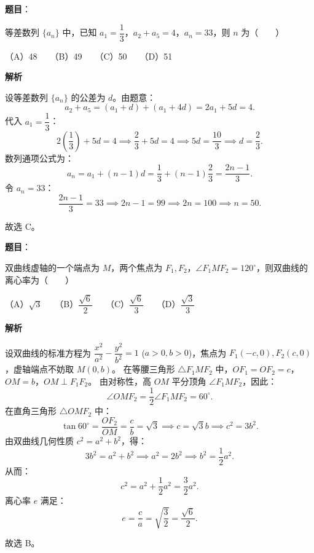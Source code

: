 \begin{answer}

\textbf{题目}：

等差数列 $\{a_n\}$ 中，已知 $a_1 = \dfrac{1}{3}$，$a_2 + a_5 = 4$，$a_n = 33$，则 $n$ 为\mbox{（　　）}

（A）48　　（B）49　　（C）50　　（D）51

\textbf{解析}

设等差数列 $\{a_n\}$ 的公差为 $d$。由题意：
\nopagebreak[4]
\[a_2 + a_5 = (a_1 + d) + (a_1 + 4d) = 2a_1 + 5d = 4.\]
代入 $a_1 = \dfrac{1}{3}$：
\nopagebreak[4]
\[2 \left(\frac{1}{3}\right) + 5d = 4 \implies \frac{2}{3} + 5d = 4 \implies 5d = \frac{10}{3} \implies d = \frac{2}{3}.\]
数列通项公式为：
\nopagebreak[4]
\[a_n = a_1 + (n - 1)d = \frac{1}{3} + (n - 1)\frac{2}{3} = \frac{2n - 1}{3}.\]
令 $a_n = 33$：
\nopagebreak[4]
\[\frac{2n - 1}{3} = 33 \implies 2n - 1 = 99 \implies 2n = 100 \implies n = 50.\]

故选 C。


\end{answer}
\begin{answer}

\textbf{题目}：

双曲线虚轴的一个端点为 $M$，两个焦点为 $F_1, F_2$，$\angle F_1 M F_2 = 120^\circ$，则双曲线的离心率为\mbox{（　　）}

（A）$\sqrt{3}$　　（B）$\dfrac{\sqrt{6}}{2}$　　（C）$\dfrac{\sqrt{6}}{3}$　　（D）$\dfrac{\sqrt{3}}{3}$

\textbf{解析}

设双曲线的标准方程为 $\dfrac{x^2}{a^2} - \dfrac{y^2}{b^2} = 1$ ($a > 0, b > 0$)，焦点为 $F_1(-c, 0), F_2(c, 0)$，虚轴端点不妨取 $M(0, b)$。
在等腰三角形 $\triangle F_1 M F_2$ 中，$OF_1 = OF_2 = c$，$OM = b$，$OM \perp F_1F_2$。
由对称性，高 $OM$ 平分顶角 $\angle F_1 M F_2$，因此：
\nopagebreak[4]
\[\angle O M F_2 = \frac{1}{2} \angle F_1 M F_2 = 60^\circ.\]
在直角三角形 $\triangle O M F_2$ 中：
\nopagebreak[4]
\[\tan 60^\circ = \frac{OF_2}{OM} = \frac{c}{b} = \sqrt{3} \implies c = \sqrt{3}b \implies c^2 = 3b^2.\]
由双曲线几何性质 $c^2 = a^2 + b^2$，得：
\nopagebreak[4]
\[3b^2 = a^2 + b^2 \implies a^2 = 2b^2 \implies b^2 = \frac{1}{2}a^2.\]
从而：
\nopagebreak[4]
\[c^2 = a^2 + \frac{1}{2}a^2 = \frac{3}{2}a^2.\]
离心率 $e$ 满足：
\nopagebreak[4]
\[e = \frac{c}{a} = \sqrt{\frac{3}{2}} = \frac{\sqrt{6}}{2}.\]

故选 B。


\end{answer}
